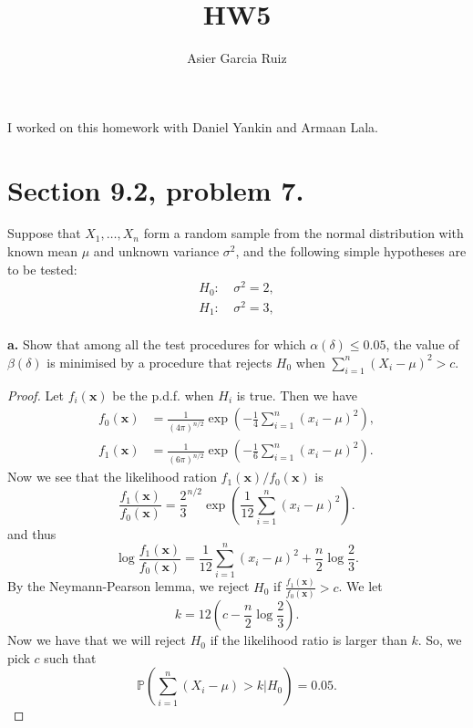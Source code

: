 \documentclass{article}
\title{HW5}
\author{Asier Garcia Ruiz}
\renewcommand{\P}[1]{\mathbb{P}\left(#1\right)}
\newcommand{\randsamp}{X_1,\dots,X_n}
\newcommand{\pdf}{p.d.f. }
\newenvironment{hwproof}[1]
{
    #1
    \begin{proof}
}{
    \end{proof}
}
\begin{document}
\maketitle
I worked on this homework with Daniel Yankin and Armaan Lala.

\section{Section 9.2, problem 7.}
\begin{hwproof}
    {Suppose that $\randsamp$ form a random sample from the normal distribution
        with known mean $\mu$ and unknown variance $\sigma^2$, and the following
        simple hypotheses are to be tested:
        \begin{align*}
            H_0: & \ \sigma^2 = 2, \\
            H_1: & \ \sigma^2 = 3, \\
        \end{align*}

        \textbf{a.} Show that among all the test procedures for which $\alpha(\delta) \leq 0.05$,
        the value of $\beta(\delta)$ is minimised by a procedure that rejects $H_0$ when
        $\sum_{i=1}^n (X_i - \mu)^2 > c$.
    }
    Let $f_i(\bm{x})$ be the \pdf when $H_i$ is true. Then we have
    \begin{align*}
        f_0(\bm{x}) & = \frac{1}{(4\pi)^{n/2}}\exp\left(-\frac{1}{4}\sum_{i=1}^n(x_i-\mu)^2\right), \\
        f_1(\bm{x}) & = \frac{1}{(6\pi)^{n/2}}\exp\left(-\frac{1}{6}\sum_{i=1}^n(x_i-\mu)^2\right).
    \end{align*}
    Now we see that the likelihood ration $f_1(\bm{x}) / f_0(\bm{x})$ is
    \begin{equation*}
        \frac{f_1(\bm{x})}{f_0(\bm{x})} =
        \frac{2}{3}^{n/2} \exp\left(\frac{1}{12}\sum_{i=1}^n(x_i - \mu)^2\right).
    \end{equation*}
    and thus
    \begin{equation*}
        \log\frac{f_1(\bm{x})}{f_0(\bm{x})} =
        \frac{1}{12}\sum_{i=1}^n(x_i - \mu)^2 + \frac{n}{2} \log\frac{2}{3}.
    \end{equation*}
    By the Neymann-Pearson lemma, we reject $H_0$ if $\frac{f_1(\bm{x})}{f_0(\bm{x})} > c$.
    We let
    \begin{equation*}
        k = 12(c - \frac{n}{2} \log\frac{2}{3}).
    \end{equation*}
    Now we have that we will reject $H_0$ if the likelihood ratio is larger than $k$. So,
    we pick $c$ such that
    \begin{equation*}
        \P{\sum_{i=1}^n(X_i - \mu) > k | H_0} = 0.05.
    \end{equation*}

\end{hwproof}
\end{document}
